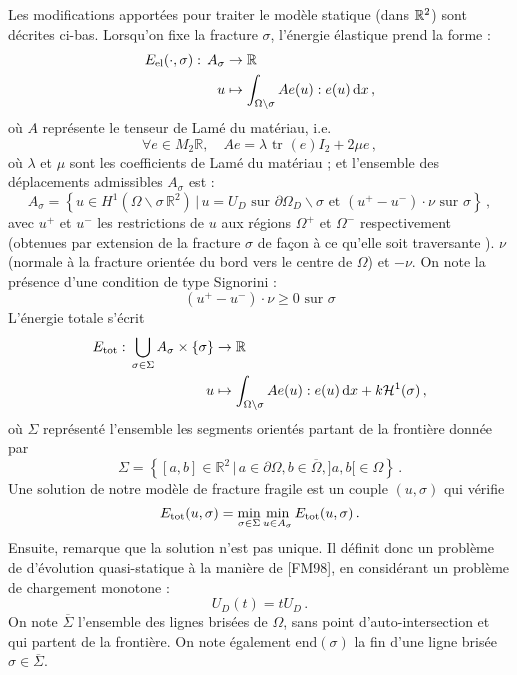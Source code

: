 Les modifications apportées pour traiter le modèle statique (dans $\mathbb{R}^2$) sont décrites ci-bas. Lorsqu'on fixe la fracture $\sigma$, l'énergie élastique prend la forme :
\begin{align*}
\eel (\cdot,\sigma): \, A_{\sigma} &\rightarrow \mathbb{R} \\
u &\mapsto \int_{\Omega \backslash \sigma} Ae(u) : e(u) \diff x \,,
\end{align*}
où $A$ représente le tenseur de Lamé du matériau, i.e.
$$
    \forall e \in M_2{\mathbb{R}}, \quad Ae = \lambda \text{ tr }(e)I_2 + 2\mu e \,,
$$ 
où $\lambda$ et $\mu$ sont les coefficients de Lamé du matériau ; et l'ensemble des déplacements admissibles $A_{\sigma}$ est :
$$
A_{\sigma} = \left\{  u \in H^1(\Omega \backslash \sigma \, \mathbb{R}^2) \, \rvert \, u=U_D \text{ sur } \partial \Omega_D \backslash \sigma \text{ et } (u^+ - u^{-}) \cdot \nu \text{ sur } \sigma \right\} \,,
$$
avec $u^{+}$ et $u^{−}$ les restrictions de $u$ aux régions $\Omega^{+}$ et $\Omega^{-}$ respectivement (obtenues par extension de la fracture $\sigma$ de façon à ce qu'elle soit traversante \parencite[p.50]{balasoiu2020thesis}). $\nu$ (normale à la fracture orientée du bord vers le centre de $\Omega$) et $−\nu$. On note la présence d'une condition de type Signorini :
$$
(u^+ - u^{-}) \cdot \nu \geq 0 \text{  sur  } \sigma
$$
L'énergie totale s'écrit
\begin{align*}
\etot : \,\bigcup_{\sigma \in \Sigma } A_{\sigma} \times \left\{ \sigma \right\} &\rightarrow \mathbb{R} \\
 u &\mapsto \int_{\Omega \backslash \sigma} Ae(u) : e(u) \diff x + k\mathcal{H}^1(\sigma)\,,
\end{align*}
où $\Sigma$ représenté l'ensemble les segments orientés partant de la frontière donnée par 
$$
\Sigma = \left\{ [a,b] \in \mathbb{R}^2 \, \lvert \, a \in \partial\Omega, b\in \overline{\Omega}, ]a,b[ \in \Omega\right\} \,.
$$
Une solution de notre modèle de fracture fragile est un couple $(u, \sigma)$ qui vérifie
$$
E_{\text{tot}}(u,\sigma) = \min_{\sigma \in \Sigma}{\min_{u\in A_{\sigma}}{E_{\text{tot}}(u,\sigma)}} \,.
$$
Ensuite, \citeauthor{balasoiu2020thesis} remarque que la solution n'est pas unique. Il définit donc un problème de d'évolution quasi-statique à la manière de [FM98], en considérant un problème de chargement monotone : 
$$
U_D(t) = tU_D \,.
$$
On note $\overline{\Sigma}$ l’ensemble des lignes brisées de $\Omega$, sans point d’auto-intersection et qui partent de la frontière. On note également $\text{end}(\sigma)$ la fin d’une ligne brisée $\sigma \in  \overline{\Sigma}$.

